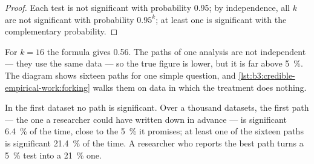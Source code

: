 \begin{proof}
Each test is not significant with probability 0.95; by independence, all $k$ are
not significant with probability $0.95^k$; at least one is significant with the
complementary probability.
\end{proof}

For $k = 16$ the formula gives 0.56. The paths of one analysis are not
independent --- they use the same data --- so the true figure is lower, but it
is far above 5~\%. The diagram shows sixteen paths for one simple question, and
\cref{lst:b3:credible-empirical-work:forking} walks them on data in which the
treatment does nothing.

\begin{omfigure}
\par{}
\end{omfigure}

\label{lst:b3:credible-empirical-work:forking}

\label{out:b3:credible-empirical-work:forking}

In the first dataset no path is significant. Over a thousand datasets, the
first path --- the one a researcher could have written down in advance --- is
significant 6.4~\% of the time, close to the 5~\% it promises; at least one of the
sixteen paths is significant 21.4~\% of the time. %
A researcher who reports the best path turns a 5~\% test into a 21~\% one.

